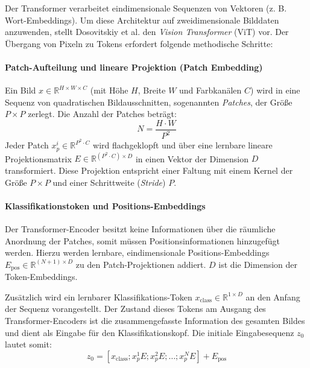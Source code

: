 Der Transformer verarbeitet eindimensionale Sequenzen von Vektoren (z. B. Wort-Embeddings). Um diese Architektur auf zweidimensionale Bilddaten anzuwenden, stellt Dosovitskiy et al. \cite{vit2020} den \emph{Vision Transformer} (ViT) vor. Der Übergang von Pixeln zu Tokens erfordert folgende methodische Schritte:

\paragraph{Patch-Aufteilung und lineare Projektion (Patch Embedding)}
Ein Bild $x \in \mathbb{R}^{H \times W \times C}$ (mit Höhe $H$, Breite $W$ und Farbkanälen $C$) wird in eine Sequenz von quadratischen Bildausschnitten, sogenannten \emph{Patches}, der Größe $P \times P$ zerlegt. Die Anzahl der Patches beträgt:
\begin{equation}
    N = \frac{H \cdot W}{P^2}
\end{equation}
Jeder Patch $x_p^i \in \mathbb{R}^{P^2 \cdot C}$ wird flachgeklopft und über eine lernbare lineare Projektionsmatrix $E \in \mathbb{R}^{(P^2 \cdot C) \times D}$ in einen Vektor der Dimension $D$ transformiert. Diese Projektion entspricht einer Faltung mit einem Kernel der Größe $P \times P$ und einer Schrittweite (\emph{Stride}) $P$.

\paragraph{Klassifikationstoken und Positions-Embeddings}
Der Transformer-Encoder besitzt keine Informationen über die räumliche Anordnung der Patches, somit müssen Positionsinformationen hinzugefügt werden. Hierzu werden lernbare, eindimensionale Positions-Embeddings $E_{\text{pos}} \in \mathbb{R}^{(N+1) \times D}$ zu den Patch-Projektionen addiert. $D$ ist die Dimension der Token-Embeddings.

Zusätzlich wird ein lernbarer Klassifikations-Token  $x_{\text{class}} \in \mathbb{R}^{1 \times D}$ an den Anfang der Sequenz vorangestellt. Der Zustand dieses Tokens am Ausgang des Transformer-Encoders ist die zusammengefasste Information des gesamten Bildes und dient als Eingabe für den Klassifikationskopf. Die initiale Eingabesequenz $z_0$ lautet somit:
\begin{equation}
    z_0 = [x_{\text{class}}; x_p^1 E; x_p^2 E; \dots; x_p^N E] + E_{\text{pos}}
\end{equation}

